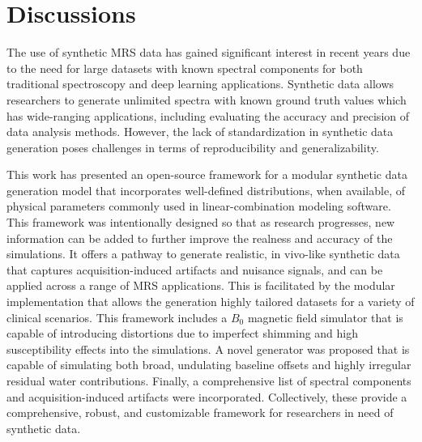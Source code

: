 \section{Discussions}\label{sec:Conclusions}
The use of synthetic MRS data has gained significant interest in recent years due to the need for large datasets with known spectral components for both traditional spectroscopy and deep learning applications. Synthetic data allows researchers to generate unlimited spectra with known ground truth values which has wide-ranging applications, including evaluating the accuracy and precision of data analysis methods. However, the lack of standardization in synthetic data generation poses challenges in terms of reproducibility and generalizability.
 
This work has presented an open-source framework for a modular synthetic data generation model that incorporates well-defined distributions, when available, of physical parameters commonly used in linear-combination modeling software. This framework was intentionally designed so that as research progresses, new information can be added to further improve the realness and accuracy of the simulations. It offers a pathway to generate realistic, in vivo-like synthetic data that captures acquisition-induced artifacts and nuisance signals, and can be applied across a range of MRS applications. This is facilitated by the modular implementation that allows the generation highly tailored datasets for a variety of clinical scenarios. This framework includes a $B_0$ magnetic field simulator that is capable of introducing distortions due to imperfect shimming and high susceptibility effects into the simulations. A novel generator was proposed that is capable of simulating both broad, undulating baseline offsets and highly irregular residual water contributions. Finally, a comprehensive list of spectral components and acquisition-induced artifacts were incorporated. Collectively, these provide a comprehensive, robust, and customizable framework for researchers in need of synthetic data.
 
